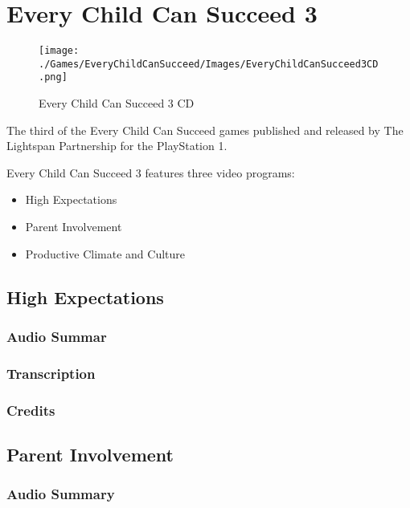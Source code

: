 \chapter{Every Child Can Succeed 3}

\begin{figure}[H]
    \centering
    \texttt{[image: ./Games/EveryChildCanSucceed/Images/EveryChildCanSucceed3CD.png]}
    \caption{Every Child Can Succeed 3 CD}
\end{figure}

The third of the Every Child Can Succeed games published and released by The Lightspan Partnership for the PlayStation 1.

Every Child Can Succeed 3 features three video programs:

\begin{itemize}
    \item High Expectations
    \item Parent Involvement
    \item Productive Climate and Culture
\end{itemize}

\clearpage
\newpage

\section{High Expectations}

\subsection{Audio Summar}

\subsection{Transcription}

\subsection{Credits}

\section{Parent Involvement}

\subsection{Audio Summary}

